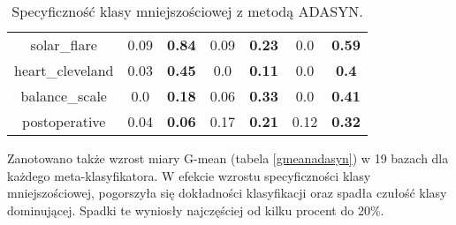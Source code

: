 \begin{table}[H]
\begin{center}
{\begin{tabular}{c|cccccc}
				solar\_flare&0.09&\textbf{0.84}&0.09&\textbf{0.23}&0.0&\textbf{0.59}\\%
				heart\_cleveland&0.03&\textbf{0.45}&0.0&\textbf{0.11}&0.0&\textbf{0.4}\\%
				balance\_scale&0.0&\textbf{0.18}&0.06&\textbf{0.33}&0.0&\textbf{0.41}\\%
				postoperative&0.04&\textbf{0.06}&0.17&\textbf{0.21}&0.12&\textbf{0.32}\\%
			\end{tabular}}
			\caption{Specyficzność klasy mniejszościowej z metodą ADASYN.}
			\label{specadasyn}
		\end{center}
	\end{table}
Zanotowano także wzrost miary G-mean (tabela \ref{gmeanadasyn}) w 19 bazach dla każdego meta-klasyfikatora. W efekcie wzrostu specyficzności klasy mniejszościowej, pogorszyła się dokładności klasyfikacji oraz spadła czułość klasy dominującej. Spadki te wyniosły najczęściej od kilku procent do 20\%.

